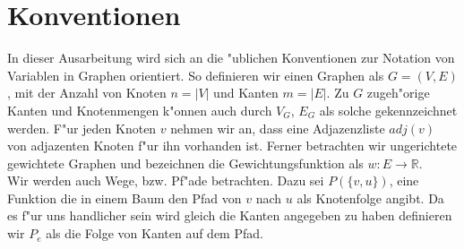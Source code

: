 \section{Konventionen}
In dieser Ausarbeitung wird sich an die "ublichen Konventionen zur Notation
    von Variablen in Graphen orientiert. So definieren wir einen Graphen als
    $G = (V,E)$, mit der Anzahl von Knoten $n = |V|$ und Kanten $m = |E|$.
    Zu $G$ zugeh"orige Kanten und Knotenmengen k"onnen auch durch $V_G$, $E_G$
    als solche gekennzeichnet werden.
    F"ur jeden Knoten $v$ nehmen wir an, dass eine Adjazenzliste $adj(v)$ von
    adjazenten Knoten f"ur ihn vorhanden ist.
    Ferner betrachten wir ungerichtete gewichtete Graphen und bezeichnen 
    die Gewichtungsfunktion als $w: E \rightarrow \mathbb{R}$.\\
Wir werden auch Wege, bzw. Pf"ade betrachten. 
    Dazu sei $P(\{v,u\})$, eine Funktion die in einem Baum den Pfad 
    von $v$ nach $u$ als Knotenfolge angibt. Da es f"ur uns handlicher sein wird
    gleich die Kanten angegeben zu haben definieren wir $P_e$ als die Folge von
    Kanten auf dem Pfad.\\
